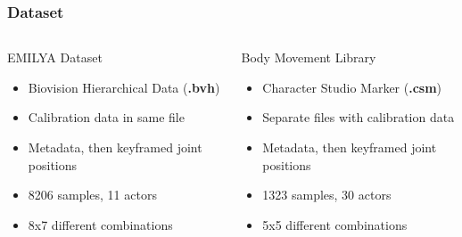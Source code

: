 \documentclass[14pt]{beamer}
\theoremstyle{remark}
\begin{document}
\begin{frame}
	\frametitle{Dataset}
	\begin{columns}
		\begin{column}{0.5\linewidth}\centering
			EMILYA Dataset
			
			\begin{itemize}
				\item Biovision Hierarchical Data (\textbf{.bvh})
				\item Calibration data in same file
				\item Metadata, then keyframed joint positions
				\item 8206 samples, 11 actors
				\item 8x7 different combinations
			\end{itemize}
		\end{column}
		\begin{column}{0.5\linewidth}\centering
			Body Movement Library
			
			\begin{itemize}
				\item Character Studio Marker (\textbf{.csm})
				\item Separate files with calibration data
				\item Metadata, then keyframed joint positions
				\item 1323 samples, 30 actors
				\item 5x5 different combinations
			\end{itemize}
		\end{column}
	\end{columns}
\end{frame}
\end{document}
